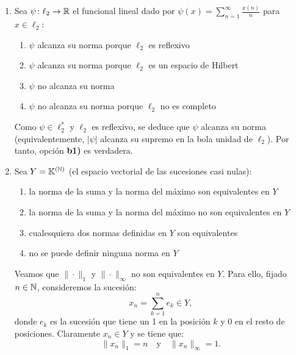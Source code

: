 \documentclass[12pt]{article}
\begin{document}
\begin{ejercicio}
\begin{enumerate}[label=\alph*)]
            \item Sea $\psi \colon \ell_2 \to \mathbb{R}$ el funcional lineal dado por $\psi(x) = \sum\limits_{n=1}^\infty \frac{x(n)}{n}$ para $x \in \ell_2$:
            \begin{enumerate}[label={b\arabic*)}]
                \item $\psi$ alcanza su norma porque $\ell_2$ es reflexivo
                \item $\psi$ alcanza su norma porque $\ell_2$ es un espacio de Hilbert
                \item $\psi$ no alcanza su norma
                \item $\psi$ no alcanza su norma porque $\ell_2$ no es completo
            \end{enumerate}

            Como $\psi\in \ell_2^*$ y $\ell_2$ es reflexivo, se deduce que $\psi$ alcanza su norma (equivalentemente, $|\psi|$ alcanza su supremo en la bola unidad de $\ell_2$). Por tanto, opción \textbf{b1)} es verdadera.

            \item Sea $Y = \mathbb{K}^{(\mathbb{N})}$ (el espacio vectorial de las sucesiones casi nulas):
            \begin{enumerate}[label={c\arabic*)}]
                \item la norma de la suma y la norma del máximo son equivalentes en $Y$
                \item la norma de la suma y la norma del máximo no son equivalentes en $Y$
                \item cualesquiera dos normas definidas en $Y$ son equivalentes
                \item no se puede definir ninguna norma en $Y$
            \end{enumerate}

            Veamos que $\|\cdot\|_1$ y $\|\cdot\|_\infty$ no son equivalentes en $Y$. Para ello, fijado $n \in \mathbb{N}$, consideremos la sucesión:
            \begin{equation*}
                x_n = \sum_{k=1}^n e_k \in Y,
            \end{equation*}
            donde $e_k$ es la sucesión que tiene un 1 en la posición $k$ y 0 en el resto de posiciones. Claramente $x_n \in Y$ y se tiene que:
            \begin{equation*}
                \|x_n\|_1 = n \quad \text{y} \quad \|x_n\|_\infty = 1.
            \end{equation*}


\end{enumerate}
\end{ejercicio}
\end{document}
